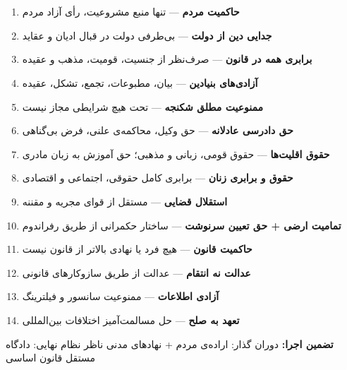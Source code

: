 \documentclass[a4paper,11pt]{article}
\begin{document}
\section{}

\begin{principlebox}[title={\rl{۱۴ اصل غیرقابل‌نقض --- خط قرمز مطلق}}]
\begin{enumerate}[label=\textcolor{mahestan-blue}{\bfseries\arabic*.},
itemsep=3pt, font=\small]
\item \textbf{حاکمیت مردم} ---
تنها منبع مشروعیت، رأی آزاد مردم
\item \textbf{جدایی دین از دولت} ---
بی‌طرفی دولت در قبال ادیان و عقاید
\item \textbf{برابری همه در قانون} ---
صرف‌نظر از جنسیت، قومیت، مذهب و عقیده
\item \textbf{آزادی‌های بنیادین} ---
بیان، مطبوعات، تجمع، تشکل، عقیده
\item \textbf{ممنوعیت مطلق شکنجه} ---
تحت هیچ شرایطی مجاز نیست
\item \textbf{حق دادرسی عادلانه} ---
حق وکیل، محاکمه‌ی علنی، فرض بی‌گناهی
\item \textbf{حقوق اقلیت‌ها} ---
حقوق قومی، زبانی و مذهبی؛ حق آموزش به زبان مادری
\item \textbf{حقوق و برابری زنان} ---
برابری کامل حقوقی، اجتماعی و اقتصادی
\item \textbf{استقلال قضایی} ---
مستقل از قوای مجریه و مقننه
\item \textbf{تمامیت ارضی + حق تعیین سرنوشت} ---
ساختار حکمرانی از طریق رفراندوم
\item \textbf{حاکمیت قانون} ---
هیچ فرد یا نهادی بالاتر از قانون نیست
\item \textbf{عدالت نه انتقام} ---
عدالت از طریق سازوکارهای قانونی
\item \textbf{آزادی اطلاعات} ---
ممنوعیت سانسور و فیلترینگ
\item \textbf{تعهد به صلح} ---
حل مسالمت‌آمیز اختلافات بین‌المللی
\end{enumerate}
\vspace{0.3cm}
{\footnotesize\textcolor{text-medium}{%
\textbf{تضمین اجرا:}
دوران گذار: اراده‌ی مردم + نهادهای مدنی ناظر
\quad\textbar\quad
نظام نهایی: دادگاه مستقل قانون اساسی}}
\end{principlebox}

\section{}
\end{document}
